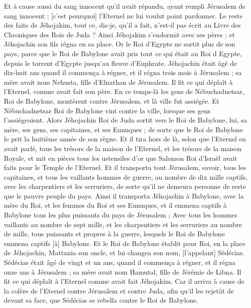 \begin{multicols}{2}
Et à cause aussi du sang innocent qu'il avait répandu, ayant rempli Jérusalem de sang innocent ; [c'est pourquoi] l'Eternel ne lui voulut point pardonner.
Le reste des faits de Jéhojakim, tout ce, dis-je, qu'il a fait, n'est-il pas écrit au Livre des Chroniques des Rois de Juda ?
Ainsi Jéhojakim s'endormit avec ses pères ; et Jéhojachin son fils régna en sa place.
Or le Roi d'Egypte ne sortit plus de son pays, parce que le Roi de Babylone avait pris tout ce qui était au Roi d Egypte, depuis le torrent d'Egypte jusqu'au fleuve d'Euphrate.
Jéhojachin était âgé de dix-huit ans quand il commença à régner, et il régna trois mois à Jérusalem ; sa mère avait nom Nehusta, fille d'Elnathan de Jérusalem.
Il fit ce qui déplaît à l'Eternel, comme avait fait son père.
En ce temps-là les gens de Nébuchadnetsar, Roi de Babylone, montèrent contre Jérusalem, et là ville fut assiégée.
Et Nébuchadnetsar Roi de Babylone vint contre la ville, lorsque ses gens l'assiégeaient.
Alors Jéhojachin Roi de Juda sortit vers le Roi de Babylone, lui, sa mère, ses gens, ses capitaines, et ses Eunuques ; de sorte que le Roi de Babylone le prit la huitième année de son règne.
Et il tira hors de là, selon que l'Eternel en avait parlé, tous les trésors de la maison de l'Eternel, et les trésors de la maison Royale, et mit en pièces tous les ustensiles d'or que Salomon Roi d'Israël avait faits pour le Temple de l'Eternel.
Et il transporta tout Jérusalem, savoir, tous les capitaines, et tous les vaillants hommes de guerre, au nombre de dix mille captifs, avec les charpentiers et les serruriers, de sorte qu'il ne demeura personne de reste que le pauvre peuple du pays.
Ainsi il transporta Jéhojachin à Babylone, avec la mère du Roi, et les femmes du Roi et ses Eunuques, et il emmena captifs à Babylone tous les plus puissants du pays de Jérusalem ;
Avec tous les hommes vaillants au nombre de sept mille, et les charpentiers et les serruriers au nombre de mille, tous puissants et propres à la guerre, lesquels le Roi de Babylone emmena captifs [à] Babylone.
Et le Roi de Babylone établit pour Roi, en la place de Jéhojachin, Mattania son oncle, et lui changea son nom, [l'appelant] Sédécias.
Sédécias était âgé de vingt et un ans, quand il commença à régner, et il régna onze ans à Jérusalem ; sa mère avait nom Hamutal, fille de Jérémie de Libna.
Il fit ce qui déplaît à l'Eternel comme avait fait Jéhojakim.
Car il arriva à cause de la colère de l'Eternel contre Jérusalem et contre Juda, afin qu'il les rejetât de devant sa face, que Sédécias se rebella contre le Roi de Babylone.

\end{multicols}
